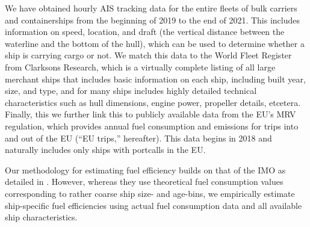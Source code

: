 \documentclass[hidelinks, 12pt,letterpaper]{article}
\begin{document}
We have obtained hourly AIS tracking data for the entire fleets of bulk carriers and containerships from the beginning of 2019 to the end of 2021. This includes information on speed, location, and draft (the vertical distance between the waterline and the bottom of the hull), which can be used to determine whether a ship is carrying cargo or not. We match this data to the World Fleet Register from Clarksons Research, which is a virtually complete listing of all large merchant ships that includes basic  information on each ship, including built year, size, and type, and for many ships includes highly detailed technical characteristics such as hull dimensions, engine power, propeller details, etcetera. Finally, this we further link this to publicly available data from the EU's MRV regulation, which provides annual fuel consumption and emissions for trips into and out of the EU (``EU trips,'' hereafter). This data begins in 2018 and naturally includes only ships with portcalls in the EU.

Our methodology for estimating fuel efficiency builds on that of the IMO as detailed in \citet{faber2020fourth}.
However, whereas they use theoretical fuel consumption values corresponding to rather coarse ship size- and age-bins, we empirically estimate ship-specific fuel efficiencies using actual fuel consumption data and all available ship characteristics. 
\end{document}

